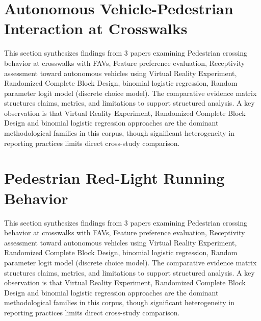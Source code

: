 \documentclass{article}
\begin{document}
\section{Autonomous Vehicle-Pedestrian Interaction at Crosswalks}
This section synthesizes findings from 3 papers examining Pedestrian crossing behavior at crosswalks with FAVs, Feature preference evaluation, Receptivity assessment toward autonomous vehicles using Virtual Reality Experiment, Randomized Complete Block Design, binomial logistic regression, Random parameter logit model (discrete choice model). The comparative evidence matrix structures claims, metrics, and limitations to support structured analysis. A key observation is that Virtual Reality Experiment, Randomized Complete Block Design and binomial logistic regression approaches are the dominant methodological families in this corpus, though significant heterogeneity in reporting practices limits direct cross-study comparison.

\section{Pedestrian Red-Light Running Behavior}
This section synthesizes findings from 3 papers examining Pedestrian crossing behavior at crosswalks with FAVs, Feature preference evaluation, Receptivity assessment toward autonomous vehicles using Virtual Reality Experiment, Randomized Complete Block Design, binomial logistic regression, Random parameter logit model (discrete choice model). The comparative evidence matrix structures claims, metrics, and limitations to support structured analysis. A key observation is that Virtual Reality Experiment, Randomized Complete Block Design and binomial logistic regression approaches are the dominant methodological families in this corpus, though significant heterogeneity in reporting practices limits direct cross-study comparison.
\end{document}
